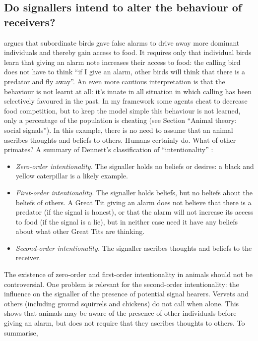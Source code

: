 \subsection{Do signallers intend to alter the behaviour of receivers? \label{TheoryOfMind}}
\citet{Moller1998:FalseAlarmCalls} argues that subordinate birds gave false alarms to drive away more dominant
individuals and thereby gain access to food. It requires only that individual birds learn that
giving an alarm note increases their access to food: the calling bird does not
have to think ``if I give an alarm, other birds will think that there is a predator and fly away''.
An even more cautious interpretation is that the behaviour is not learnt at all:
it's innate in all situation in which calling has been selectively favoured in the past.
In my framework some agents cheat to decrease food competition, but to keep the model
simple this behaviour is not learned, only a percentage of the population is
cheating (see Section ``Animal theory: social signals''). In this example,
there is no need to assume that an animal ascribes thoughts and beliefs to others.
Humans certainly do. What of other primates?
A summary of Dennett's classification of ``intentionality'' \citep{Dennett1987:Intentional}:
\begin{itemize}
 \item \textit{Zero-order intentionality.} The signaller holds no beliefs or desires:
 a black and yellow caterpillar is a likely example.
 \item \textit{First-order intentionality.} The signaller holds beliefs,
but no beliefs about the beliefs of others.
A Great Tit giving an alarm does not believe that there is a predator (if the signal is honest),
or that the alarm will not increase its access to food (if the signal is a lie),
but in neither case need it have any beliefs about what other Great Tits are thinking.
 \item \textit{Second-order intentionality.}  The signaller ascribes thoughts and beliefs to the receiver.
\end{itemize}
The existence of zero-order and first-order intentionality in animals
should not be controversial. One problem is relevant for the second-order intentionality:
the influence on the signaller of the presence of potential signal hearers.
Vervets and others (including ground squirrels and chickens) do not call when alone.
This shows that animals may be aware of the presence of other individuals before giving an
alarm, but does not require that they ascribes thoughts to others. To summarise,
